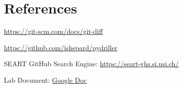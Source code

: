 \documentclass[10pt,a4paper]{report}
\begin{document}
\section{References}
\begin{enumerate}[label={[\arabic*]}, itemsep=0.05em, topsep=0pt]
    \item \url{https://git-scm.com/docs/git-diff}
    \item \url{https://github.com/ishepard/pydriller}
    \item SEART GitHub Search Engine: \url{https://seart-ghs.si.usi.ch/}
    \item Lab Document: \href{https://drive.google.com/file/d/1wXXE9zMZYFjfrX5OjIdYlJKI0oX1knQS/view}{Google Doc}
\end{enumerate}
\end{document}
